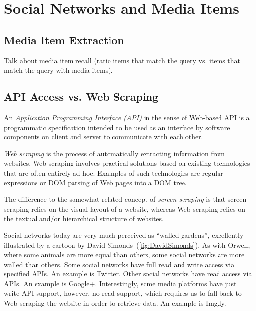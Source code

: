 \documentclass{acm_proc_article-sp}
\let\oldemph\emph
\renewcommand{\emph}[1]{\oldemph{\fontsize{9}{9}\selectfont #1}}
\begin{document}
\section{Social Networks and Media Items}

\subsection{Media Item Extraction}
Talk about media item recall (ratio items that match the query vs. items that match the query with media items).

\subsection{API Access vs. Web Scraping}
An \emph{Application Programming Interface (API)} in the sense of Web-based API is a programmatic specification intended to be used as an interface by software components on client and server to communicate with each other.

\emph{Web scraping} is the process of automatically extracting information from websites.
Web scraping involves practical solutions based on existing technologies that are often entirely ad hoc.
Examples of such technologies are regular expressions or DOM parsing of Web pages into a DOM tree.

The difference to the somewhat related concept of \emph{screen scraping} is that screen scraping relies on the visual layout of a website, whereas Web scraping relies on the textual and/or hierarchical structure of websites.

Social networks today are very much perceived as ``walled gardens'', excellently illustrated by a cartoon by David Simonds~(\autoref{fig:DavidSimonds}).
As with Orwell, where some animals are more equal than others, some social networks are more walled than others.
Some social networks have full read and write access via specified APIs.
An example is Twitter.
Other social networks have read access via APIs.
An example is Google+.
Interestingly, some media platforms have just write API support, however, no read support, which requires us to fall back to Web scraping the website in order to retrieve data.
An example is Img.ly.
\end{document}
